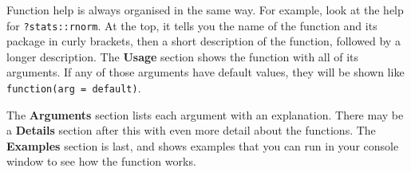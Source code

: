 \documentclass[
  oneside]{book}
\begin{document}
Function help is always organised in the same way. For example, look at the help for \texttt{?stats::rnorm}. At the top, it tells you the name of the function and its package in curly brackets, then a short description of the function, followed by a longer description. The \textbf{Usage} section shows the function with all of its arguments{}. If any of those arguments have default values, they will be shown like \texttt{function(arg\ =\ default)}.

The \textbf{Arguments} section lists each argument with an explanation. There may be a \textbf{Details} section after this with even more detail about the functions. The \textbf{Examples} section is last, and shows examples that you can run in your console window to see how the function works.

\begin{try}


\end{try}
\end{document}
